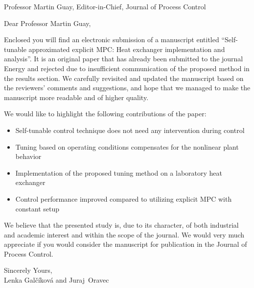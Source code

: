 \documentclass[a4paper,10pt]{letter}
\begin{document}
\pagestyle{headings}
\begin{letter}{Professor Martin Guay, Editor-in-Chief, Journal of Process Control}

\opening{Dear Professor Martin Guay,}

Enclosed you will find an electronic submission of a manuscript entitled ``Self-tunable approximated explicit MPC: Heat exchanger implementation and analysis''. It is an original paper that has already been submitted to the journal Energy and rejected due to insufficient communication of the proposed method in the results section. We carefully revisited and updated the manuscript based on the reviewers' comments and suggestions, and hope that we managed to make the manuscript more readable and of higher quality. 

We would like to highlight the following contributions of the paper:
\begin{itemize}
	\item Self-tunable control technique does not need any intervention during control
	\item Tuning based on operating conditions compensates for the nonlinear plant behavior
	\item Implementation of the proposed tuning method on a laboratory heat exchanger 
	\item Control performance improved compared to utilizing explicit MPC with constant setup
\end{itemize}

We believe that the presented study is, due to its character, of both industrial and academic interest and within the scope of the journal. We would very much appreciate if you would consider the manuscript for publication in the Journal of Process Control.

Sincerely Yours, \\
Lenka Gal\v{c}\'{i}kov\'{a} and Juraj~Oravec

\end{letter}
\end{document}
